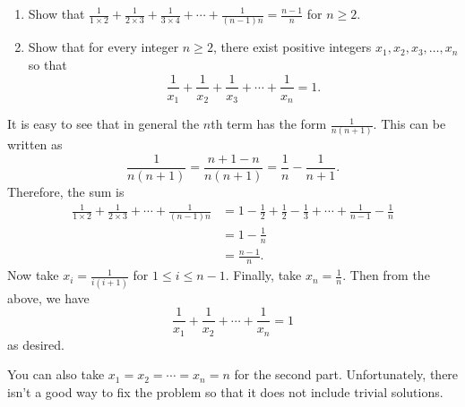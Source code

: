 \begin{question}
    \begin{enumerate}
        \item Show that $\frac{1}{1 \times 2} + \frac{1}{2 \times 3} +
            \frac{1}{3 \times 4} + \cdots + \frac{1}{(n - 1)n} = \frac{n -
            1}{n}$ for $n \geq 2$. 
        
        \item Show that for every integer $n \geq 2$, there exist positive
            integers $x_{1}, x_{2}, x_{3}, \ldots, x_{n}$ so that 
        \[ \frac{1}{x_{1}} + \frac{1}{x_{2}} + \frac{1}{x_{3}} + \cdots +
        \frac{1}{x_{n}} = 1.\] 
    \end{enumerate}
\end{question}
\begin{solution}
    It is easy to see that in general the $n$th term has the form $\frac{1}{n(n
    + 1)}$. This can be written as
    \[ \frac{1}{n(n + 1)} = \frac{n + 1 - n}{n(n + 1)} = \frac{1}{n} -
    \frac{1}{n + 1}. \]
    Therefore, the sum is 
    \begin{align*}
        \frac{1}{1 \times 2} + \frac{1}{2 \times 3} + \cdots + \frac{1}{(n - 1)n} &= 1 - \frac{1}{2} + \frac{1}{2} - \frac{1}{3} + \cdots + \frac{1}{n - 1} - \frac{1}{n}\\
        &= 1 - \frac{1}{n}\\
        &= \frac{n - 1}{n}. 
    \end{align*}
    Now take $x_i = \frac{1}{i(i + 1)}$ for $1 \leq i \leq n - 1$. Finally,
    take $x_n = \frac{1}{n}$. Then from the above, we have
    \[ \frac{1}{x_1} + \frac{1}{x_2} + \cdots + \frac{1}{x_n} = 1 \]
    as desired.
\end{solution}
\begin{remark}
    You can also take $x_1 = x_2 = \cdots = x_n = n$ for the second part.
    Unfortunately, there isn't a good way to fix the problem so that it does
    not include trivial solutions.
\end{remark}

